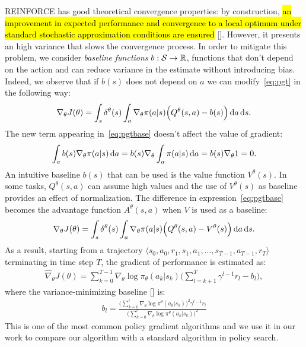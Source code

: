 REINFORCE has good theoretical convergence properties: by construction, \hl{an improvement in expected performance and convergence to a local optimum under standard stochastic approximation conditions are ensured} [\cite{sutton2018reinforcement}]. However, it presents an high variance that slows the convergence process. In order to mitigate this problem, we consider \emph{baseline functions} $b: \mathcal{S} \to \mathbb{R}$, \ie functions that don't depend on the action and can reduce variance in the estimate without introducing bias.
Indeed, we observe that if $b(s)$ does not depend on $a$ we can modify~\eqref{eq:pgt} in the following way:
\begin{align} \nabla_{\theta}J(\theta) = \int_s \delta^{\theta}(s) \int_a \nabla_{\theta} \pi(a|s) \Big( Q^{\theta}(s,a) -b(s) \Big) \,\mathrm{d} a \,\mathrm{d} s. \label{eq:pgtbase}\end{align}
The new term appearing in~\eqref{eq:pgtbase} doesn't affect the value of gradient:
\begin{align} \int_a b(s) \nabla_{\theta} \pi(a|s) \,\mathrm{d} a = b(s) \nabla_{\theta} \int_a \pi(a|s) \,\mathrm{d} a = b(s) \nabla_{\theta} 1 = 0. \end{align}
An intuitive baseline $b(s)$ that can be used is the value function $V^{\theta}(s)$. In some tasks, $Q^{\theta}(s,a)$ can assume high values and the use of $V^{\theta}(s)$ as baseline provides an effect of normalization. The difference in expression~\eqref{eq:pgtbase} becomes the advantage function $A^{\theta}(s,a)$ when $V$ is used as a baseline:
\begin{align} \nabla_{\theta}J(\theta) = \int_s \delta^{\theta}(s) \int_a \nabla_{\theta} \pi(a|s) \Big( Q^{\theta}(s,a) - V^{\theta}(s) \Big) \,\mathrm{d} a \,\mathrm{d} s.\end{align}
As a result, starting from a trajectory $\langle s_0, a_0, r_1, s_1, a_1, ..., s_{T-1}, a_{T-1}, r_{T} \rangle$ terminating in time step $T$, the gradient of performance is estimated as:
\begin{align}
\widehat{\nabla}_{\theta}J(\theta) = \sum_{k=0}^{T-1} \nabla_{\theta}\log\pi_{\theta}(a_k|s_k)\Big(\sum_{l=k+1}^{T}\gamma^{l-1}r_{l} - b_{l} \Big),
\end{align}
where the variance-minimizing baseline [\cite{Peters2008ReinforcementLO}] is: 
\begin{align} b_l = \frac{\Big( \sum_{k=0}^{l}\nabla_{\theta} \log\pi^{\theta}(a_k|s_k)\Big)^2 \gamma^{l-1}r_l} {\Big( \sum_{k=0}^{l}\nabla_{\theta} \log\pi^{\theta}(a_k|s_k)\Big)^2}
\end{align} 
This is one of the most common policy gradient algorithms and we use it in our work to compare our algorithm with a standard algorithm in policy search.

